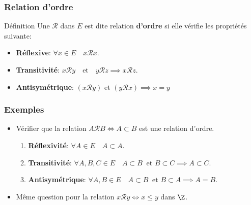 \documentclass[usenames,dvipsnames]{beamer}
\begin{document}
\begin{frame}[t]
  \frametitle{Relation d'ordre}
 \begin{block}{Définition}
   Une $\mathcal{R}$ dans $E$ est dite relation \textbf{\alert{d'ordre}} si elle vérifie
   les propriétés suivante:

   \begin{itemize}
     \small
   \item \textbf{Réflexive}: $\forall x \in E\quad x \mathcal{R} x$.\\[8pt]
    \item \textbf{Transitivité}: $ x \mathcal{R} y \quad \text{et}\quad
     y\mathcal{R}z\implies x\mathcal{R}z$.\\[8pt]

   \item \textbf{Antisymétrique}: $\left(x\mathcal{R}y\right) \text{ et } \left( y
   \mathcal{R} x\right) \implies x=y$
 \end{itemize}
 \end{block} 
 \begin{center}
 \end{center}

 \end{frame}


 \begin{frame}[<+->]
   \frametitle{Exemples}
   \begin{itemize}
\item Vérifier que la relation $A \mathcal{R} B \iff A \subset B$ est une
  relation d'ordre.

  \begin{enumerate}
    \small
  \item \textbf{Réflexivité}: $\forall A\in E\quad A \subset A$.\\[8pt]
  \item \textbf{Transitivité}: $\forall A,B,C\in E\quad A \subset B\;\;\text{et
    }B\subset C \implies A\subset C$.\\[8pt]
  \item \textbf{Antisymétrique}: $\forall A, B \in E\quad A \subset B
    \;\;\text{et } B\subset A \implies A=B$.

  \end{enumerate}
  \vspace*{1cm}
\item Même question pour la relation $x\mathcal{R} y \iff x\leq y$ dans $\Z$.
   \end{itemize} 
 \end{frame}
\end{document}

